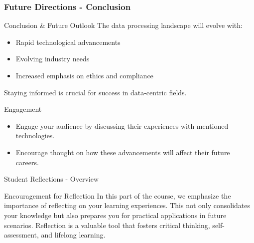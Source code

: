 \documentclass[aspectratio=169]{beamer}
\begin{document}
\begin{frame}[fragile]
    \frametitle{Future Directions - Conclusion}
    \begin{block}{Conclusion \& Future Outlook}
        The data processing landscape will evolve with:
        \begin{itemize}
            \item Rapid technological advancements
            \item Evolving industry needs
            \item Increased emphasis on ethics and compliance
        \end{itemize}
        Staying informed is crucial for success in data-centric fields.
    \end{block}
    
    \begin{block}{Engagement}
        \begin{itemize}
            \item Engage your audience by discussing their experiences with mentioned technologies.
            \item Encourage thought on how these advancements will affect their future careers.
        \end{itemize}
    \end{block}
\end{frame}

\begin{frame}[fragile]{Student Reflections - Overview}
    \begin{block}{Encouragement for Reflection}
        In this part of the course, we emphasize the importance of reflecting on your learning experiences. 
        This not only consolidates your knowledge but also prepares you for practical applications in future scenarios. 
        Reflection is a valuable tool that fosters critical thinking, self-assessment, and lifelong learning.
    \end{block}
\end{frame}
\end{document}
